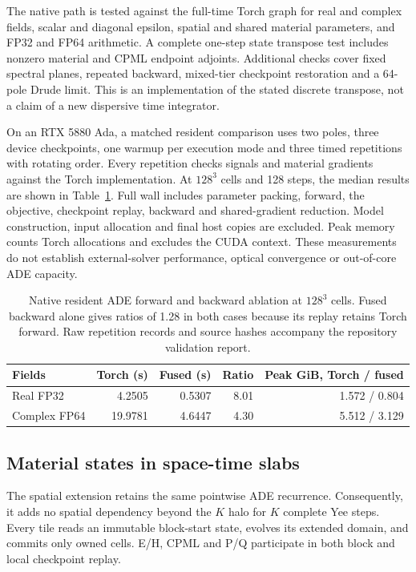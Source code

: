 \documentclass[11pt,a4paper]{article}
\begin{document}
The native path is tested against the full-time Torch graph for real and
complex fields, scalar and diagonal epsilon, spatial and shared material
parameters, and FP32 and FP64 arithmetic. A complete one-step state
transpose test includes nonzero material and CPML endpoint adjoints.
Additional checks cover fixed spectral planes, repeated backward,
mixed-tier checkpoint restoration and a 64-pole Drude limit.
This is an implementation of the stated discrete transpose, not a claim
of a new dispersive time integrator.

On an RTX 5880 Ada, a matched resident comparison uses two poles,
three device checkpoints, one warmup per execution mode and three timed
repetitions with rotating order. Every repetition checks signals and material
gradients against the Torch implementation. At $128^3$ cells and 128 steps,
the median results are shown in Table~\ref{tab:ade-cuda}.
Full wall includes parameter packing, forward, the objective, checkpoint
replay, backward and shared-gradient reduction. Model construction, input
allocation and final host copies are excluded. Peak memory counts Torch
allocations and excludes the CUDA context. These measurements do not establish
external-solver performance, optical convergence or out-of-core ADE capacity.
\begin{table}[ht]
\centering
\begin{tabular}{lrrrr}
\toprule
Fields & Torch (s) & Fused (s) & Ratio & Peak GiB, Torch / fused \\
\midrule
Real FP32 & 4.2505 & 0.5307 & 8.01 & 1.572 / 0.804 \\
Complex FP64 & 19.9781 & 4.6447 & 4.30 & 5.512 / 3.129 \\
\bottomrule
\end{tabular}
\caption{Native resident ADE forward and backward ablation at $128^3$ cells.
Fused backward alone gives ratios of 1.28 in both cases because its replay
retains Torch forward. Raw repetition records and source hashes accompany
the repository validation report.}
\label{tab:ade-cuda}
\end{table}
\subsection{Material states in space-time slabs}
The spatial extension retains the same pointwise ADE recurrence.
Consequently, it adds no spatial dependency beyond the
$K$ halo for $K$ complete Yee steps. Every tile reads an immutable
block-start state, evolves its extended domain, and commits only owned cells.
E/H, CPML and P/Q participate in both block and local checkpoint replay.
\end{document}
